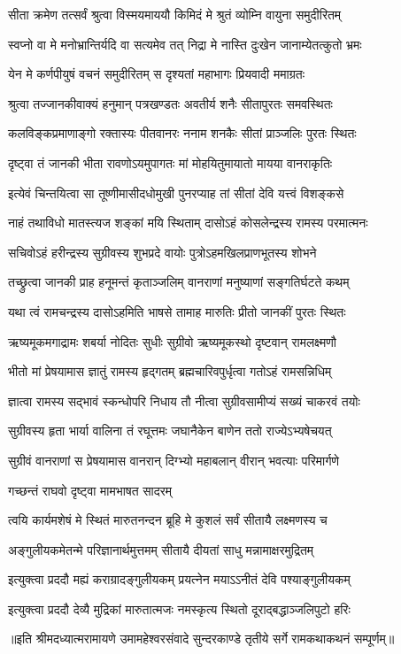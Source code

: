 \twolineshloka
{सीता क्रमेण तत्सर्वं श्रुत्वा विस्मयमाययौ}
{किमिदं मे श्रुतं व्योम्नि वायुना समुदीरितम्} %

\twolineshloka
{स्वप्नो वा मे मनोभ्रान्तिर्यदि वा सत्यमेव तत्}
{निद्रा मे नास्ति दुःखेन जानाम्येतत्कुतो भ्रमः} %

\twolineshloka
{येन मे कर्णपीयुषं वचनं समुदीरितम्}
{स दृश्यतां महाभागः प्रियवादी ममाग्रतः} %

\twolineshloka
{श्रुत्वा तज्जानकीवाक्यं हनुमान् पत्रखण्डतः}
{अवतीर्य शनैः सीतापुरतः समवस्थितः} %

\twolineshloka
{कलविङ्कप्रमाणाङ्गो रक्तास्यः पीतवानरः}
{ननाम शनकैः सीतां प्राञ्जलिः पुरतः स्थितः} %

\twolineshloka
{दृष्ट्वा तं जानकी भीता रावणोऽयमुपागतः}
{मां मोहयितुमायातो मायया वानराकृतिः} %

\twolineshloka
{इत्येवं चिन्तयित्वा सा तूष्णीमासीदधोमुखी}
{पुनरप्याह तां सीतां देवि यत्त्वं विशङ्कसे} %

\twolineshloka
{नाहं तथाविधो मातस्त्यज शङ्कां मयि स्थिताम्}
{दासोऽहं कोसलेन्द्रस्य रामस्य परमात्मनः} %

\twolineshloka
{सचिवोऽहं हरीन्द्रस्य सुग्रीवस्य शुभप्रदे}
{वायोः पुत्रोऽहमखिलप्राणभूतस्य शोभने} %

\twolineshloka
{तच्छ्रुत्वा जानकी प्राह हनूमन्तं कृताञ्जलिम्}
{वानराणां मनुष्याणां सङ्गतिर्घटते कथम्} %

\twolineshloka
{यथा त्वं रामचन्द्रस्य दासोऽहमिति भाषसे}
{तामाह मारुतिः प्रीतो जानकीं पुरतः स्थितः} %

\twolineshloka
{ऋष्यमूकमगाद्रामः शबर्या नोदितः सुधीः}
{सुग्रीवो ऋष्यमूकस्थो दृष्टवान् रामलक्ष्मणौ} %

\twolineshloka
{भीतो मां प्रेषयामास ज्ञातुं रामस्य हृद्गतम्}
{ब्रह्मचारिवपुर्धृत्वा गतोऽहं रामसन्निधिम्} %

\twolineshloka
{ज्ञात्वा रामस्य सद्भावं स्कन्धोपरि निधाय तौ}
{नीत्वा सुग्रीवसामीप्यं सख्यं चाकरवं तयोः} %

\twolineshloka
{सुग्रीवस्य हृता भार्या वालिना तं रघूत्तमः}
{जघानैकेन बाणेन ततो राज्येऽभ्यषेचयत्} %

\twolineshloka
{सुग्रीवं वानराणां स प्रेषयामास वानरान्}
{दिग्भ्यो महाबलान् वीरान् भवत्याः परिमार्गणे} %

\onelineshloka
{गच्छन्तं राघवो दृष्ट्वा मामभाषत सादरम्} %

\twolineshloka
{त्वयि कार्यमशेषं मे स्थितं मारुतनन्दन}
{ब्रूहि मे कुशलं सर्वं सीतायै लक्ष्मणस्य च} %

\twolineshloka
{अङ्गुलीयकमेतन्मे परिज्ञानार्थमुत्तमम्}
{सीतायै दीयतां साधु मन्नामाक्षरमुद्रितम्} %

\twolineshloka
{इत्युक्त्वा प्रददौ मह्यं कराग्रादङ्गुलीयकम्}
{प्रयत्नेन मयाऽऽनीतं देवि पश्याङ्गुलीयकम्} %

\twolineshloka
{इत्युक्त्वा प्रददौ देव्यै मुद्रिकां मारुतात्मजः}
{नमस्कृत्य स्थितो दूराद्बद्धाञ्जलिपुटो हरिः} %

॥इति श्रीमदध्यात्मरामायणे उमामहेश्वरसंवादे सुन्दरकाण्डे तृतीये सर्गे रामकथाकथनं सम्पूर्णम्॥

\closesection